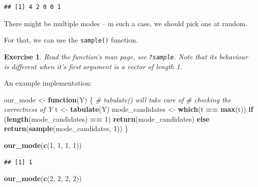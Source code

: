 \documentclass[10pt,b5paper,krantz1]{krantz}
\newenvironment{Shaded}{\begin{snugshade}}{\end{snugshade}}
\newcommand{\CommentTok}[1]{\textcolor[rgb]{0.37,0.37,0.37}{\textit{#1}}}
\newcommand{\ControlFlowTok}[1]{\textcolor[rgb]{0.27,0.27,0.27}{\textbf{#1}}}
\newcommand{\DecValTok}[1]{\textcolor[rgb]{0.06,0.06,0.06}{#1}}
\newcommand{\KeywordTok}[1]{\textcolor[rgb]{0.27,0.27,0.27}{\textbf{#1}}}
\newcommand{\NormalTok}[1]{#1}
\newcommand{\OperatorTok}[1]{\textcolor[rgb]{0.43,0.43,0.43}{\textbf{#1}}}
\newcommand{\StringTok}[1]{\textcolor[rgb]{0.5,0.5,0.5}{#1}}
\newtheorem{exercise}{Exercise}[chapter]
\begin{document}
\begin{verbatim}
## [1] 4 2 0 0 1
\end{verbatim}

There might be multiple modes -- in such a case, we should pick one at random.

For that, we can use the \texttt{sample()} function.

\begin{exercise}

Read the function's man page, see \texttt{?sample}.
Note that its behaviour is different when it's first argument is a vector of length 1.

\end{exercise}

An example implementation:

\begin{Shaded}
\begin{Highlighting}[]
\NormalTok{our_mode <-}\StringTok{ }\ControlFlowTok{function}\NormalTok{(Y) \{}
    \CommentTok{# tabulate() will take care of}
    \CommentTok{# checking the correctness of Y}
\NormalTok{    t <-}\StringTok{ }\KeywordTok{tabulate}\NormalTok{(Y)}
\NormalTok{    mode_candidates <-}\StringTok{ }\KeywordTok{which}\NormalTok{(t }\OperatorTok{==}\StringTok{ }\KeywordTok{max}\NormalTok{(t))}
    \ControlFlowTok{if}\NormalTok{ (}\KeywordTok{length}\NormalTok{(mode_candidates) }\OperatorTok{==}\StringTok{ }\DecValTok{1}\NormalTok{) }\KeywordTok{return}\NormalTok{(mode_candidates)}
    \ControlFlowTok{else} \KeywordTok{return}\NormalTok{(}\KeywordTok{sample}\NormalTok{(mode_candidates, }\DecValTok{1}\NormalTok{))}
\NormalTok{\}}
\end{Highlighting}
\end{Shaded}

\begin{Shaded}
\begin{Highlighting}[]
\KeywordTok{our_mode}\NormalTok{(}\KeywordTok{c}\NormalTok{(}\DecValTok{1}\NormalTok{, }\DecValTok{1}\NormalTok{, }\DecValTok{1}\NormalTok{, }\DecValTok{1}\NormalTok{))}
\end{Highlighting}
\end{Shaded}

\begin{verbatim}
## [1] 1
\end{verbatim}

\begin{Shaded}
\begin{Highlighting}[]
\KeywordTok{our_mode}\NormalTok{(}\KeywordTok{c}\NormalTok{(}\DecValTok{2}\NormalTok{, }\DecValTok{2}\NormalTok{, }\DecValTok{2}\NormalTok{, }\DecValTok{2}\NormalTok{))}
\end{Highlighting}
\end{Shaded}
\end{document}
